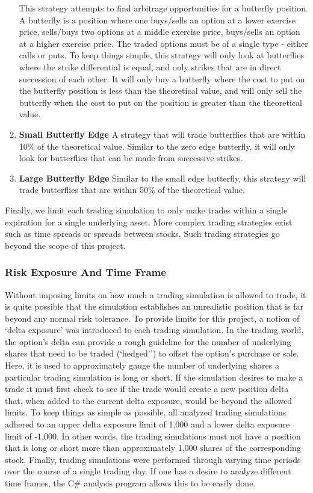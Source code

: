 \documentclass[12pt, a4paper, notitlepage]{article}
\numberwithin{equation}{subsection}
\numberwithin{figure}{subsection}
\numberwithin{table}{subsection}
\newcommand{\newpar}{\newline \newline}
\begin{document}
\begin{enumerate}
        This strategy attempts to find arbitrage opportunities for a butterfly position.  A butterfly is a position where one buys/sells an option at a lower exercise price, sells/buys two options at a middle exercise price, buys/sells an option at a higher exercise price.  The traded options must be of a single type - either calls or puts.  To keep things simple, this strategy will only look at butterflies where the strike differential is equal, and only strikes that are in direct succession of each other.  It will only buy a butterfly where the cost to put on the butterfly position is less than the theoretical value, and will only sell the butterfly when the cost to put on the position is greater than the theoretical value.
    \item \textbf{Small Butterfly Edge}
        A strategy that will trade butterflies that are within 10\% of the theoretical value.  Similar to the zero edge butterfly, it will only look for butterflies that can be made from successive strikes.
    \item \textbf{Large Butterfly Edge}
        Similar to the small edge butterfly, this strategy will trade butterflies that are within 50\% of the theoretical value.
\end{enumerate}
Finally, we limit each trading simulation to only make trades within a single expiration for a single underlying asset.  More complex trading strategies exist such as time spreads or spreads between stocks.  Such trading strategies go beyond the scope of this project.

\subsubsection{Risk Exposure And Time Frame}
\label{subsec:RiskExposureAndTimeFrame}
Without imposing limits on how much a trading simulation is allowed to trade, it is quite possible that the simulation establishes an unrealistic position that is far beyond any normal risk tolerance.  To provide limits for this project, a notion of `delta exposure' was introduced to each trading simulation.  In the trading world, the option's delta can provide a rough guideline for the number of underlying shares that need to be traded (`hedged'') to offset the option's purchase or sale.  Here, it is used to approximately gauge the number of underlying shares a particular trading simulation is long or short.  If the simulation desires to make a trade it must first check to see if the trade would create a new position delta that, when added to the current delta exposure, would be beyond the allowed limits.  To keep things as simple as possible, all analyzed trading simulations adhered to an upper delta exposure limit of 1,000 and a lower delta exposure limit of -1,000.  In other words, the trading simulations must not have a position that is long or short more than approximately 1,000 shares of the corresponding stock.
\newpar
Finally, trading simulations were performed through varying time periods over the course of a single trading day.  If one has a desire to analyze different time frames, the C\# analysis program allows this to be easily done.
\end{document}
